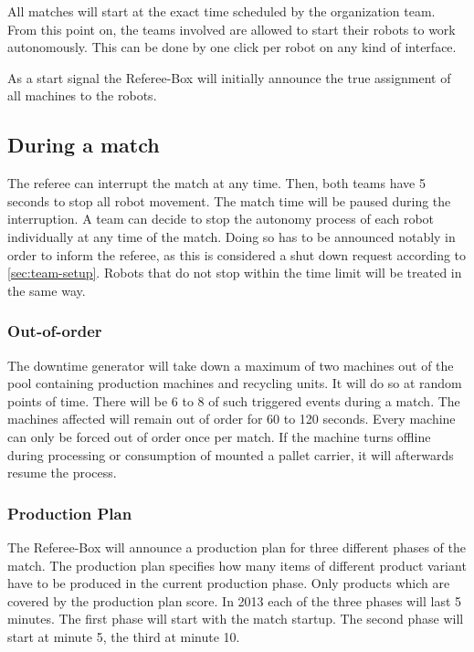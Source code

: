 \documentclass[12pt,twoside]{article}
\begin{document}
All matches will start at the exact time scheduled by the organization
team. From this point on, the teams involved are allowed to start
their robots to work autonomously. This can be done by one click per
robot on any kind of interface. 

As a start signal the Referee-Box will initially announce the true assignment of
all machines to the robots.

\subsection{During a match}

The referee can interrupt the match at any time. Then, both teams have
5 seconds to stop all robot movement. The match time will be paused
during the interruption. A team can decide to stop the autonomy
process of each robot individually at any time of the match. Doing so
has to be announced notably in order to inform the referee, as this is
considered a shut down request according to
\ref{sec:team-setup}. Robots that do not stop within the time limit
will be treated in the same way.

\subsubsection{Out-of-order}

The downtime generator will take down a maximum of two machines out of
the pool containing production machines and recycling units. It will
do so at random points of time. There will be 6 to 8 of such triggered
events during a match. The machines affected will remain out of order
for 60 to 120 seconds. Every machine can only be forced out of order
once per match. If the machine turns offline during processing or
consumption of mounted a pallet carrier, it will afterwards resume the
process.

\subsubsection{Production Plan}

The Referee-Box will announce a production plan for three different phases of
the match. The production plan specifies how many items of different product
variant have to be produced in the current production phase. Only products which
are covered by the production plan score. In 2013 each of the three phases will
last 5 minutes. The first phase will start with the match startup.  The second
phase will start at minute 5, the third at minute 10.
\end{document}
